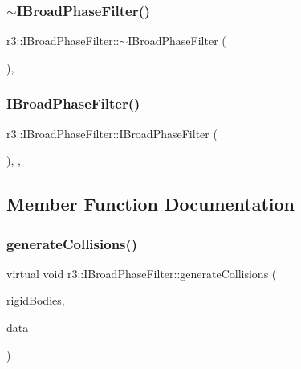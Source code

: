 \subsubsection{\texorpdfstring{$\sim$\+I\+Broad\+Phase\+Filter()}{~IBroadPhaseFilter()}}
{\footnotesize\ttfamily r3\+::\+I\+Broad\+Phase\+Filter\+::$\sim$\+I\+Broad\+Phase\+Filter (\begin{DoxyParamCaption}{ }\end{DoxyParamCaption})\hspace{0.3cm}{\ttfamily [virtual]}, {\ttfamily [default]}}

\mbox{\label{classr3_1_1_i_broad_phase_filter_ab1eb5dc44548078aa0716eedbab8ac11}} 
\subsubsection{\texorpdfstring{I\+Broad\+Phase\+Filter()}{IBroadPhaseFilter()}}
{\footnotesize\ttfamily r3\+::\+I\+Broad\+Phase\+Filter\+::\+I\+Broad\+Phase\+Filter (\begin{DoxyParamCaption}{ }\end{DoxyParamCaption})\hspace{0.3cm}{\ttfamily [explicit]}, {\ttfamily [protected]}, {\ttfamily [default]}}



\subsection{Member Function Documentation}
\mbox{\label{classr3_1_1_i_broad_phase_filter_a5f437f6390a8f10bf96d72e35e3b4432}} 
\subsubsection{\texorpdfstring{generate\+Collisions()}{generateCollisions()}}
{\footnotesize\ttfamily virtual void r3\+::\+I\+Broad\+Phase\+Filter\+::generate\+Collisions (\begin{DoxyParamCaption}\item[{const std\+::vector$<$ \mbox{\hyperlink{classr3_1_1_rigid_body}{Rigid\+Body}} $\ast$$>$ \&}]{rigid\+Bodies,  }\item[{\mbox{\hyperlink{classr3_1_1_fixed_size_container}{Fixed\+Size\+Container}}$<$ \mbox{\hyperlink{classr3_1_1_collision_pair}{Collision\+Pair}} $>$ \&}]{data }\end{DoxyParamCaption})\hspace{0.3cm}{\ttfamily [pure virtual]}}



